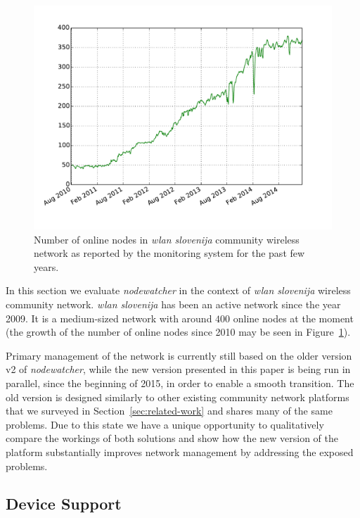 \documentclass[5p,sort&compress]{elsarticle}
\newcommand{\nodewatcher}{\textit{nodewatcher}}
\newcommand{\wlanslovenija}{\textit{wlan slovenija}}
\begin{document}
\begin{figure}
  \centering
  \includegraphics[scale=0.45]{figures/wlansi-nodes-up.pdf}
  \caption{Number of online nodes in \wlanslovenija{} community wireless network as reported by the monitoring system for the past few years.}
  \label{fig:wlansi-nodes-up}
\end{figure}

In this section we evaluate \nodewatcher{} in the context of \wlanslovenija{} wireless community network.
\wlanslovenija{} has been an active network since the year 2009.
It is a medium-sized network with around $400$ online nodes at the moment (the growth of the number of online nodes since 2010 may be seen in Figure~\ref{fig:wlansi-nodes-up}).

Primary management of the network is currently still based on the older version v2 of \nodewatcher{}, while the new version presented in this paper is being run in parallel, since the beginning of 2015, in order to enable a smooth transition.
The old version is designed similarly to other existing community network platforms that we surveyed in Section~\ref{sec:related-work} and shares many of the same problems.
Due to this state we have a unique opportunity to qualitatively compare the workings of both solutions and show how the new version of the platform substantially improves network management by addressing the exposed problems.

\subsection{Device Support}
\end{document}
